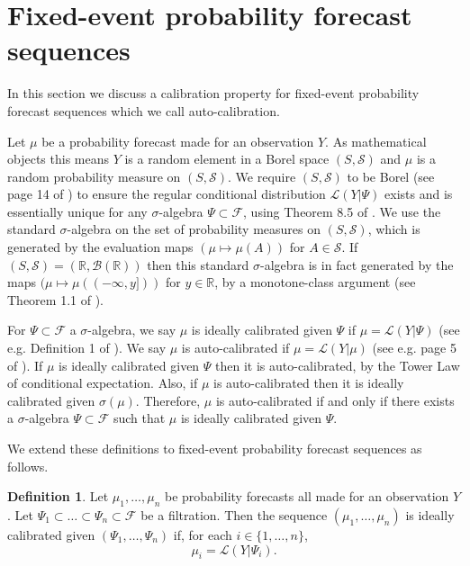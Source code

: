 \documentclass[aap]{imsart}
\theoremstyle{plain}
\theoremstyle{definition}
\newtheorem{definition}[theorem]{Definition}
\begin{document}
\section{Fixed-event probability forecast sequences}\label{fixed_event}
In this section we discuss a calibration property for fixed-event probability forecast sequences which we call auto-calibration.

Let $\mu$ be a probability forecast made for an observation $Y$. As mathematical objects this means $Y$ is a random element in a Borel space $(S, \mathcal{S})$ and $\mu$ is a random probability measure on $(S, \mathcal{S})$. We require $(S, \mathcal{S})$ to be Borel (see page 14 of \cite{Kll21}) to ensure the regular conditional distribution $\mathcal{L}(Y|\Psi)$ exists and is essentially unique for any $\sigma$-algebra $\Psi \subset \mathcal{F}$, using Theorem 8.5 of \cite{Kll21}. We use the standard $\sigma$-algebra on the set of probability measures on $(S, \mathcal{S})$, which is generated by the evaluation maps $(\mu \mapsto \mu(A))$ for $A \in \mathcal{S}$. If $(S, \mathcal{S}) = (\mathbb{R}, \mathcal{B}(\mathbb{R}))$ then this standard $\sigma$-algebra is in fact generated by the maps $(\mu \mapsto \mu((-\infty, y]))$ for $y \in \mathbb{R}$, by a monotone-class argument (see Theorem 1.1 of \cite{Kll21}).

For $\Psi \subset \mathcal{F}$ a $\sigma$-algebra, we say $\mu$ is ideally calibrated given $\Psi$ if $\mu = \mathcal{L}(Y|\Psi)$ (see e.g. Definition 1 of \cite{Tsp20}). We say $\mu$ is auto-calibrated if $\mu = \mathcal{L}(Y|\mu)$ (see e.g. page 5 of \cite{Tsp13}). If $\mu$ is ideally calibrated given $\Psi$ then it is auto-calibrated, by the Tower Law of conditional expectation. Also, if $\mu$ is auto-calibrated then it is ideally calibrated given $\sigma(\mu)$. Therefore, $\mu$ is auto-calibrated if and only if there exists a $\sigma$-algebra $\Psi \subset \mathcal{F}$ such that $\mu$ is ideally calibrated given $\Psi$.

We extend these definitions to fixed-event probability forecast sequences as follows.
\begin{definition}
  Let $\mu_1, \ldots, \mu_n$ be probability forecasts all made for an observation $Y$. Let $\Psi_1 \subset \ldots \subset \Psi_n \subset \mathcal{F}$ be a filtration. Then the sequence $(\mu_1, \ldots, \mu_n)$ is ideally calibrated given $(\Psi_1, \ldots, \Psi_n)$ if, for each $i \in \{1, \ldots, n\}$,
\begin{equation*}
\mu_i = \mathcal{L}(Y|\Psi_i).
\end{equation*}
\end{definition}
\end{document}
